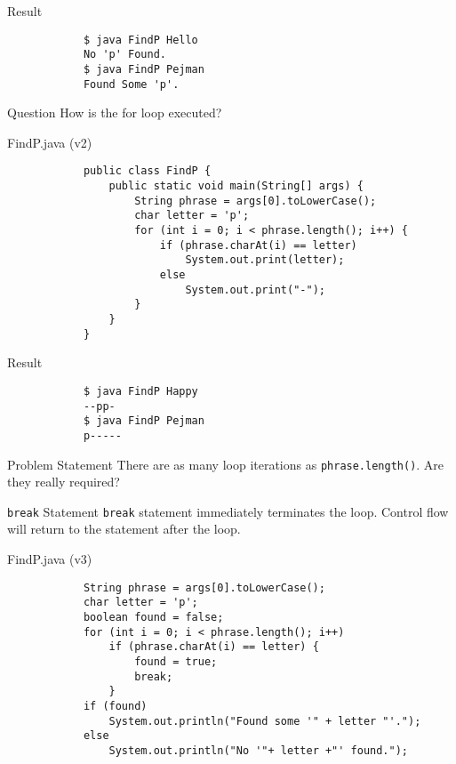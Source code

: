 \documentclass[10pt, compress]{beamer}
\begin{document}
\begin{slide}
	\begin{block}{Result}
		\begin{verbatim}
			$ java FindP Hello
			No 'p' Found.
			$ java FindP Pejman
			Found Some 'p'.
		\end{verbatim}
	\end{block}
	\begin{block}{Question}
		How is the for loop executed?
	\end{block}
\end{slide}

\begin{slide}
	\begin{block}{FindP.java (v2)}
		\begin{verbatim}
			public class FindP {
			    public static void main(String[] args) {
			        String phrase = args[0].toLowerCase();
			        char letter = 'p';
			        for (int i = 0; i < phrase.length(); i++) {
			            if (phrase.charAt(i) == letter)
			                System.out.print(letter);
			            else
			                System.out.print("-");
			        }
			    }
			}
		\end{verbatim}
	\end{block}
\end{slide}

\begin{slide}
	\begin{block}{Result}
		\begin{verbatim}
			$ java FindP Happy
			--pp-
			$ java FindP Pejman
			p-----
		\end{verbatim}
	\end{block}
	\begin{block}{Problem Statement}
		There are as many loop iterations as \texttt{phrase.length()}. Are they really required?
	\end{block}
\end{slide}

\begin{slide}
	\begin{block}{\texttt{break} Statement}
		\texttt{break} statement immediately terminates the loop.
		Control flow will return to the statement after the loop.
	\end{block}
\end{slide}

\begin{slide}
	\begin{block}{FindP.java (v3)}
		\begin{verbatim}
			String phrase = args[0].toLowerCase();
			char letter = 'p';
			boolean found = false;
			for (int i = 0; i < phrase.length(); i++)
			    if (phrase.charAt(i) == letter) {
			        found = true;
			        break;
			    }
			if (found)
			    System.out.println("Found some '" + letter "'.");
			else
			    System.out.println("No '"+ letter +"' found.");
		\end{verbatim}
	\end{block}
\end{slide}
\end{document}
